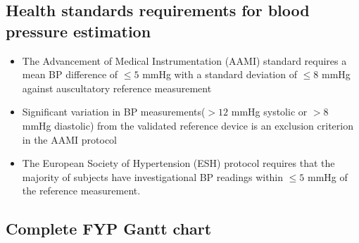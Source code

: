 \subsection{Health standards requirements for blood pressure estimation}
\begin{itemize}
    \item The Advancement of Medical Instrumentation (AAMI) standard requires a mean BP difference of $\le 5$ mmHg with a standard deviation of $\le 8$ mmHg against auscultatory reference measurement
    \item Significant variation in BP measurements($> 12$ mmHg systolic or $> 8$ mmHg diastolic) from the validated reference device is an exclusion criterion in the AAMI protocol \cite{Bard2019}
    \item The European Society of Hypertension (ESH) protocol requires that the majority of subjects have investigational BP readings within $\le 5$ mmHg of the reference measurement.
\end{itemize}

\subsection{Complete FYP Gantt chart}